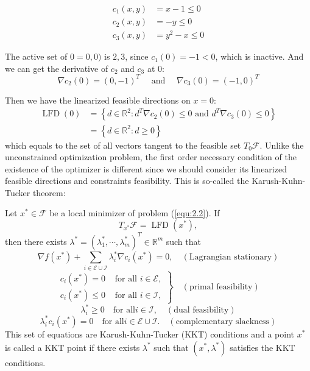 $$
\begin{aligned}
    c_1(x,y) &= x-1 \leq 0 \\
    c_2(x,y) &= -y \leq 0\\
    c_3(x,y) &= y^2 - x \leq 0
\end{aligned}
$$
\par The active set of $0={0,0)}$ is ${2, 3}$, since $c_1(0) = -1 < 0$, which is inactive. And we can get the derivative of $c_2$ and $c_3$ at 0: 
$$
\nabla c_{2}(0)=(0,-1)^{T} \quad \textrm { and } \quad \nabla c_{3}(0)=(-1,0)^{T}
$$
\par Then we have the linearized feasible directions on $x=0$: 
$$
\begin{aligned} \operatorname{LFD}(0) &=\left\{d \in \mathbb{R}^{2}: d^{T} \nabla c_{2}(0) \leq 0 \text { and } d^{T} \nabla c_{3}(0) \leq 0\right\} \\ &=\left\{d \in \mathbb{R}^{2}: d \geq 0\right\} \end{aligned}
$$
which equals to the set of all vectors tangent to the feasible set $T_{0} \mathscr{F}$. 
Unlike the unconstrained optimization problem, the first order necessary condition of the existence of the optimizer is different since we should consider its linearized feasible directions and constraints feasibility. This is so-called the Karush-Kuhn-Tucker theorem: 
\begin{thm}
    Let $x^* \in \mathscr{F}$ be a local minimizer of problem (\ref{equ:2.2}). If
    $$
    T_{x^*} \mathscr{F} = \operatorname{LFD}(x^*),
    $$
    then there exists $\lambda^{*}=\left(\lambda_{1}^{*}, \cdots, \lambda_{m}^{*}\right)^{T} \in \mathbb{R}^{m}$ such that 
    $$
    \nabla f\left(x^{*}\right)+\sum_{i \in \mathscr{E} \cup \mathscr{I}} \lambda_{i}^{*} \nabla c_{i}\left(x^{*}\right)=0, \quad(\textrm {Lagrangian stationary})
    $$
    $$
    \left.\begin{array}{ll}c_{i}\left(x^{*}\right)=0 & \text { for all } i \in \mathscr{E}, \\ c_{i}\left(x^{*}\right) \leq 0 & \text { for all } i \in \mathscr{I},\end{array}\right\} \quad(\textrm {primal feasibility})
    $$
    $$
    \lambda_{i}^{*} \geq 0 \quad \textrm {for all} i \in \mathscr{I}, \quad (\textrm {dual feasibility})
    $$
    $$
    \lambda_i^*c_i(x^*) = 0 \quad \textrm {for all} i \in \mathscr{E} \cup \mathscr{I}. \quad (\textrm {complementary slackness})
    $$
    This set of equations are Karush-Kuhn-Tucker (KKT) conditions and a point $x^*$ is called a KKT point if there exists $\lambda^*$ such that $(x^*, \lambda ^*)$ satisfies the KKT conditions.
\end{thm}
